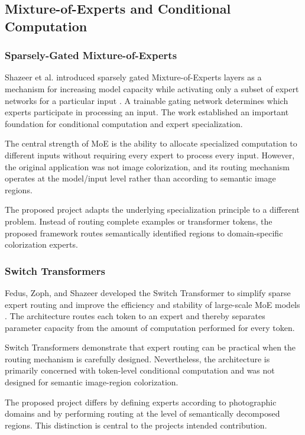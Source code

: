 \documentclass{FastFyp}
\begin{document}
\subsection{Mixture-of-Experts and Conditional Computation}

\subsubsection{Sparsely-Gated Mixture-of-Experts}

Shazeer et al. introduced sparsely gated Mixture-of-Experts layers as a mechanism for increasing model capacity while activating only a subset of expert networks for a particular input \cite{ref12}. A trainable gating network determines which experts participate in processing an input. The work established an important foundation for conditional computation and expert specialization.

The central strength of MoE is the ability to allocate specialized computation to different inputs without requiring every expert to process every input. However, the original application was not image colorization, and its routing mechanism operates at the model/input level rather than according to semantic image regions.

The proposed project adapts the underlying specialization principle to a different problem. Instead of routing complete examples or transformer tokens, the proposed framework routes semantically identified regions to domain-specific colorization experts.

\subsubsection{Switch Transformers}

Fedus, Zoph, and Shazeer developed the Switch Transformer to simplify sparse expert routing and improve the efficiency and stability of large-scale MoE models \cite{ref13}. The architecture routes each token to an expert and thereby separates parameter capacity from the amount of computation performed for every token.

Switch Transformers demonstrate that expert routing can be practical when the routing mechanism is carefully designed. Nevertheless, the architecture is primarily concerned with token-level conditional computation and was not designed for semantic image-region colorization.

The proposed project differs by defining experts according to photographic domains and by performing routing at the level of semantically decomposed regions. This distinction is central to the project\textquotesingle s intended contribution.
\end{document}
